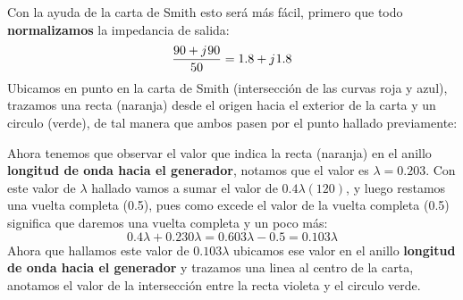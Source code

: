 \documentclass[
	12pt, %
	fleqn, %
	a4paper, %
]{LegrandOrangeBook}
\begin{document}
\begin{example}
Con la ayuda de la carta de Smith esto será más fácil, primero que todo \textbf{normalizamos} la impedancia de salida:
\begin{displaymath}
\frac{90+{j\mkern1mu} 90}{50}=1.8+{j\mkern1mu} 1.8
\end{displaymath}
Ubicamos en punto en la carta de Smith (intersección de las curvas roja y azul), trazamos una recta (naranja) desde el origen hacia el exterior de la carta  y un circulo (verde), de tal manera que ambos pasen por el punto hallado previamente:
\begin{center}
\end{center}
Ahora tenemos que observar el valor que indica la recta (naranja) en el anillo \textbf{longitud de onda hacia el generador}, notamos que el valor es $\lambda=0.203$. Con este valor de $\lambda$ hallado vamos a sumar el valor de $0.4\lambda(120)$, y luego restamos una vuelta completa (0.5), pues como excede el valor de la vuelta completa (0.5) significa que daremos una vuelta completa y un poco más:
\begin{displaymath}
0.4\lambda +0.230\lambda =0.603\lambda -0.5=0.103\lambda
\end{displaymath}
Ahora que hallamos este valor de $0.103\lambda$ ubicamos ese valor en el anillo \textbf{longitud de onda hacia el generador} y trazamos una linea al centro de la carta, anotamos el valor de la intersección entre la recta violeta y el circulo verde.
\begin{center}
\end{center}
\end{example}
\end{document}
